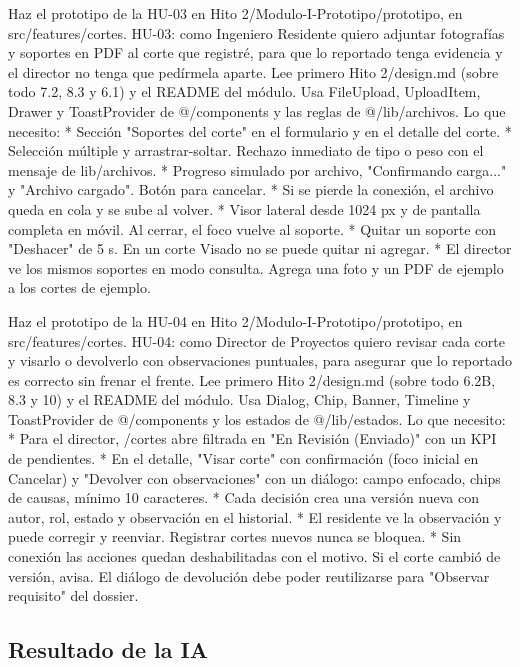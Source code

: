 \documentclass[11pt]{article}
\begin{document}
\begin{prompt}
Haz el prototipo de la HU-03 en Hito 2/Modulo-I-Prototipo/prototipo, en src/features/cortes.
HU-03: como Ingeniero Residente quiero adjuntar fotografías y soportes en PDF al corte que
registré, para que lo reportado tenga evidencia y el director no tenga que pedírmela aparte.
Lee primero Hito 2/design.md (sobre todo 7.2, 8.3 y 6.1) y el README del módulo. Usa
FileUpload, UploadItem, Drawer y ToastProvider de @/components y las reglas de @/lib/archivos.
Lo que necesito:
* Sección "Soportes del corte" en el formulario y en el detalle del corte.
* Selección múltiple y arrastrar-soltar. Rechazo inmediato de tipo o peso con el mensaje de lib/archivos.
* Progreso simulado por archivo, "Confirmando carga..." y "Archivo cargado". Botón para cancelar.
* Si se pierde la conexión, el archivo queda en cola y se sube al volver.
* Visor lateral desde 1024 px y de pantalla completa en móvil. Al cerrar, el foco vuelve al soporte.
* Quitar un soporte con "Deshacer" de 5 s. En un corte Visado no se puede quitar ni agregar.
* El director ve los mismos soportes en modo consulta.
Agrega una foto y un PDF de ejemplo a los cortes de ejemplo.
\end{prompt}

\begin{prompt}
Haz el prototipo de la HU-04 en Hito 2/Modulo-I-Prototipo/prototipo, en src/features/cortes.
HU-04: como Director de Proyectos quiero revisar cada corte y visarlo o devolverlo con
observaciones puntuales, para asegurar que lo reportado es correcto sin frenar el frente.
Lee primero Hito 2/design.md (sobre todo 6.2B, 8.3 y 10) y el README del módulo. Usa Dialog,
Chip, Banner, Timeline y ToastProvider de @/components y los estados de @/lib/estados.
Lo que necesito:
* Para el director, /cortes abre filtrada en "En Revisión (Enviado)" con un KPI de pendientes.
* En el detalle, "Visar corte" con confirmación (foco inicial en Cancelar) y "Devolver con
  observaciones" con un diálogo: campo enfocado, chips de causas, mínimo 10 caracteres.
* Cada decisión crea una versión nueva con autor, rol, estado y observación en el historial.
* El residente ve la observación y puede corregir y reenviar. Registrar cortes nuevos nunca se bloquea.
* Sin conexión las acciones quedan deshabilitadas con el motivo. Si el corte cambió de versión, avisa.
El diálogo de devolución debe poder reutilizarse para "Observar requisito" del dossier.
\end{prompt}

\subsection{Resultado de la IA}
\end{document}
